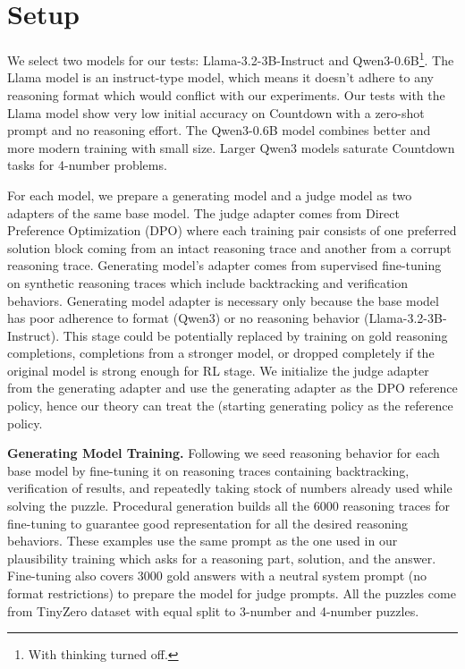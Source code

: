 \documentclass[12pt,a4paper]{article}
\begin{document}
\vspace{10pt}

\section{Setup}
\label{sec:setup}

We select two models for our tests: Llama-3.2-3B-Instruct  and Qwen3-0.6B\footnote{With thinking turned off.}. The Llama model is an instruct-type model, which means it doesn't adhere to any reasoning format which would conflict with our experiments.  Our tests with the Llama model show very low initial accuracy on Countdown with a zero-shot prompt and no reasoning effort. The Qwen3-0.6B model combines better and more modern training with small size. Larger Qwen3 models saturate Countdown tasks for 4-number problems.


For each model, we prepare a generating model and a judge model as two adapters of the same base model. The judge adapter comes from Direct Preference Optimization (DPO) where each training pair consists of one preferred solution block coming from an intact reasoning trace and another from a corrupt reasoning trace. Generating model's adapter comes from supervised fine-tuning on synthetic reasoning traces which include backtracking and verification behaviors. Generating model adapter is necessary only because the base model has poor adherence to format (Qwen3) or no reasoning behavior (Llama-3.2-3B-Instruct). This stage could be potentially replaced by training on gold reasoning completions, completions from a stronger model, or dropped completely if the original model is strong enough for RL stage. We initialize the judge adapter from the generating adapter and use the generating adapter as the DPO reference policy, hence our theory can treat the (starting generating policy as the reference policy.


\textbf{Generating Model Training.}  Following \citet{gandhi_cognitive_2025} we seed reasoning behavior for each base model by fine-tuning it on reasoning traces containing backtracking, verification of results, and repeatedly taking stock of numbers already used while solving the puzzle. Procedural generation builds all the 6000 reasoning traces for fine-tuning to guarantee good representation for all the desired reasoning behaviors. These examples use the same prompt as the one used in our plausibility training which asks for a reasoning part, solution, and the answer. Fine-tuning also covers 3000 gold answers with a neutral system prompt (no format restrictions) to prepare the model for judge prompts. All the puzzles come from TinyZero dataset \citep{pan_tinyzero_2025} with equal split to 3-number and 4-number puzzles. 
\end{document}
